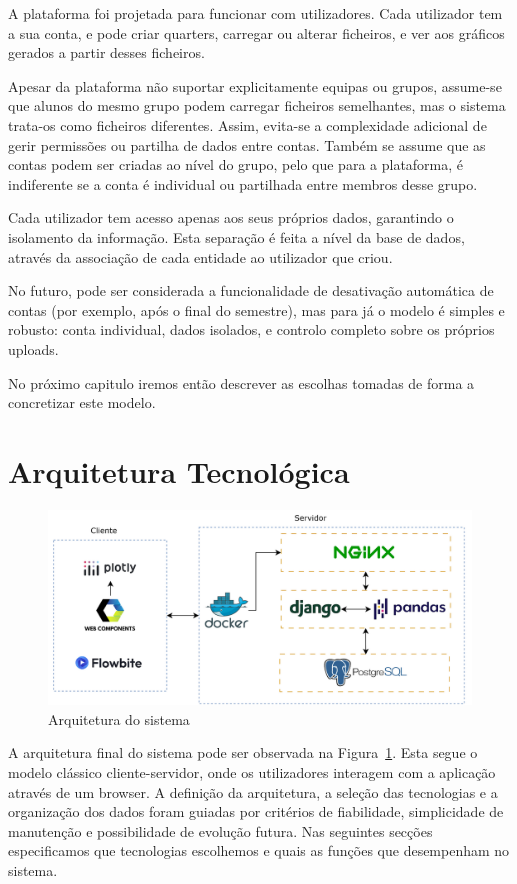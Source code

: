 A plataforma foi projetada para funcionar com utilizadores. Cada utilizador tem a sua conta, e pode criar quarters, carregar ou alterar ficheiros, e ver aos gráficos gerados a partir desses ficheiros.

Apesar da plataforma não suportar explicitamente equipas ou grupos, assume-se que alunos do mesmo grupo podem carregar ficheiros semelhantes, mas o sistema trata-os como ficheiros diferentes. Assim, evita-se a complexidade adicional de gerir permissões ou partilha de dados entre contas. Também se assume que as contas podem ser criadas ao nível do grupo, pelo que para a plataforma, é indiferente se a conta é individual ou partilhada entre membros desse grupo.

Cada utilizador tem acesso apenas aos seus próprios dados, garantindo o isolamento da informação. Esta separação é feita a nível da base de dados, através da associação de cada entidade ao utilizador que criou.

No futuro, pode ser considerada a funcionalidade de desativação automática de contas (por exemplo, após o final do semestre), mas para já o modelo é simples e robusto: conta individual, dados isolados, e controlo completo sobre os próprios uploads.

No próximo capitulo iremos então descrever as escolhas tomadas de forma a concretizar este modelo.

\section{Arquitetura Tecnológica}
\label{sec:tec}

\begin{figure}[h]
\centering
\includegraphics[width=\textwidth]{./img/arch}
\caption{Arquitetura do sistema}
\label{fig:arquitectura}
\end{figure}

A arquitetura final do sistema pode ser observada na Figura~\ref{fig:arquitectura}. Esta segue o modelo clássico cliente-servidor, onde os utilizadores interagem com a aplicação através de um browser. A definição da arquitetura, a seleção das tecnologias e a organização dos dados foram guiadas por critérios de fiabilidade, simplicidade de manutenção e possibilidade de evolução futura.  Nas seguintes secções especificamos que tecnologias escolhemos e quais as funções que desempenham no sistema.


